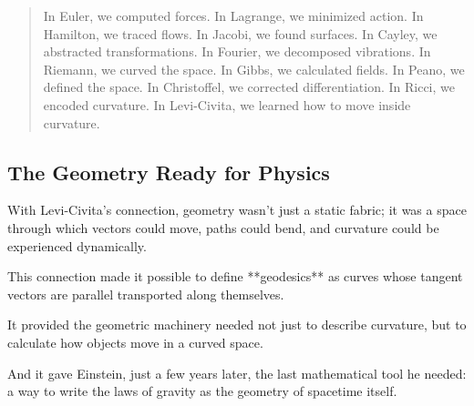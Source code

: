 \bigskip

\begin{quote}
In Euler, we computed forces.  
In Lagrange, we minimized action.  
In Hamilton, we traced flows.  
In Jacobi, we found surfaces.  
In Cayley, we abstracted transformations.  
In Fourier, we decomposed vibrations.  
In Riemann, we curved the space.  
In Gibbs, we calculated fields.  
In Peano, we defined the space.  
In Christoffel, we corrected differentiation.  
In Ricci, we encoded curvature.  
In Levi-Civita, we learned how to move inside curvature.
\end{quote}

\subsection*{The Geometry Ready for Physics}

With Levi-Civita’s connection, geometry wasn’t just a static fabric;  
it was a space through which vectors could move, paths could bend, and curvature could be experienced dynamically.

This connection made it possible to define **geodesics** as curves whose tangent vectors are parallel transported along themselves.

It provided the geometric machinery needed not just to describe curvature,  
but to calculate how objects move in a curved space.

And it gave Einstein, just a few years later, the last mathematical tool he needed:  
a way to write the laws of gravity as the geometry of spacetime itself.

